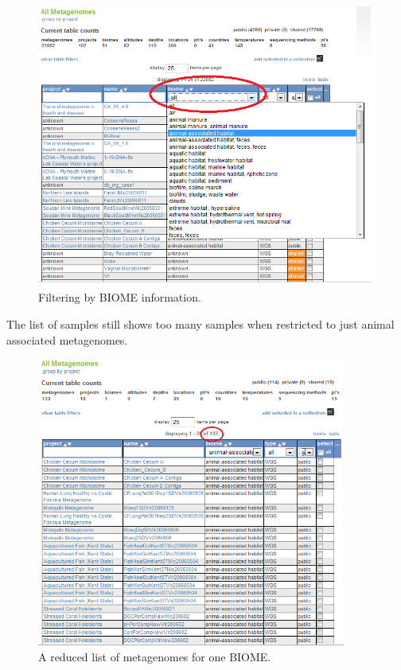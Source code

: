 \documentclass[12pt,fullpage]{report}
\begin{document}
\begin{figure}
\begin{center}
\includegraphics[width=6in]{Images/collections-filter-by-biome.png}
\end{center}
\caption{
Filtering by BIOME information. }
\label{fig:collections-filter-by-biome}
\end{figure}

The list of samples still shows too many samples when restricted to just animal associated metagenomes.

\begin{figure}
\begin{center}
\includegraphics[width=4in]{Images/collections-filtered-but-too-many.png}
\end{center}
\caption{
A reduced list of metagenomes for one BIOME. }
\label{fig:collections-filtered-but-too-many}
\end{figure}
\end{document}
